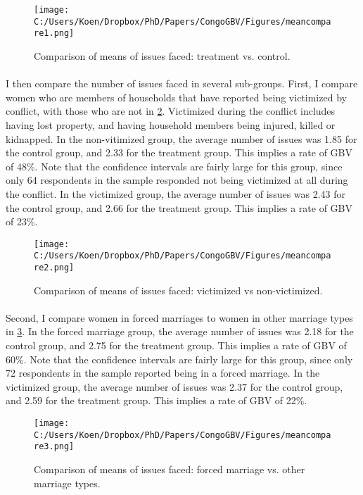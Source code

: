 \documentclass[11pt,a4paper]{scrartcl} %
\begin{document}
\begin{figure}
  \texttt{[image: C:/Users/Koen/Dropbox/PhD/Papers/CongoGBV/Figures/meancompare1.png]}
  \caption{Comparison of means of issues faced: treatment vs. control.}
  \label{fig:meancompare1}
\end{figure}

\paragraph{}
I then compare the number of issues faced in several sub-groups. First, I compare women who are members of households that have reported being victimized by conflict, with those who are not in \ref{fig:meancompare2}. Victimized during the conflict includes having lost property, and having household members being injured, killed or kidnapped. In the non-vitimized group, the average number of issues was 1.85 for the control group, and 2.33 for the treatment group. This implies a rate of GBV of 48\%. Note that the confidence intervals are fairly large for this group, since only 64 respondents in the sample responded not being victimized at all during the conflict. In the victimized group, the average number of issues was 2.43 for the control group, and 2.66 for the treatment group. This implies a rate of GBV of 23\%. 

\begin{figure}
  \texttt{[image: C:/Users/Koen/Dropbox/PhD/Papers/CongoGBV/Figures/meancompare2.png]}
  \caption{Comparison of means of issues faced: victimized vs non-victimized.}
  \label{fig:meancompare2}
\end{figure}

\paragraph{}
Second, I compare women in forced marriages to women in other marriage types in \ref{fig:meancompare3}. In the forced marriage group, the average number of issues was 2.18 for the control group, and 2.75 for the treatment group. This implies a rate of GBV of 60\%. Note that the confidence intervals are fairly large for this group, since only 72 respondents in the sample reported being in a forced marriage. In the victimized group, the average number of issues was 2.37 for the control group, and 2.59 for the treatment group. This implies a rate of GBV of 22\%. 

\begin{figure}
  \texttt{[image: C:/Users/Koen/Dropbox/PhD/Papers/CongoGBV/Figures/meancompare3.png]}
  \caption{Comparison of means of issues faced: forced marriage vs. other marriage types.}
  \label{fig:meancompare3}
\end{figure}
\end{document}
